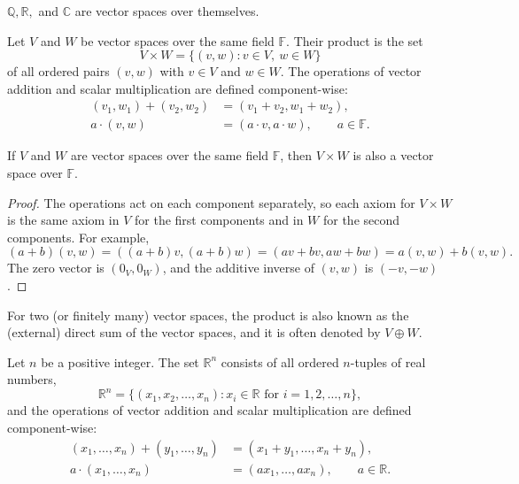 \begin{corollary}\label{L1-cor:fields}
    $\mathbb{Q}, \mathbb{R},$ and $\mathbb{C}$ are vector spaces over themselves.
\end{corollary}

\begin{definition}
    Let $V$ and $W$ be vector spaces over the same field $\mathbb{F}$. Their product is the set
    \[V \times W = \{(v, w) : v \in V, \ w \in W\}\]
    of all ordered pairs $(v, w)$ with $v \in V$ and $w \in W$. The operations of vector addition and scalar multiplication are defined component-wise:
    \begin{align*}
        (v_1, w_1) + (v_2, w_2) &= (v_1 + v_2, w_1 + w_2), \\
        a \cdot (v, w) &= (a \cdot v, a \cdot w), \qquad a \in \mathbb{F}.
    \end{align*}
\end{definition}

\begin{proposition}\label{L1-prop:product}
    If $V$ and $W$ are vector spaces over the same field $\mathbb{F}$, then $V \times W$ is also a vector space over $\mathbb{F}$.
\end{proposition}

\begin{proof}
    The operations act on each component separately, so each axiom for $V \times W$ is the same axiom in $V$ for the first components and in $W$ for the second components. For example,
    \[(a + b)(v, w) = ((a + b)v, (a + b)w) = (av + bv, aw + bw) = a(v, w) + b(v, w).\]
    The zero vector is $(0_V, 0_W)$, and the additive inverse of $(v, w)$ is $(-v, -w)$.
\end{proof}

\begin{remark}
    For two (or finitely many) vector spaces, the product is also known as the (external) direct sum of the vector spaces, and it is often denoted by $V \oplus W$.
\end{remark}

\begin{definition}
    Let $n$ be a positive integer. The set $\mathbb{R}^n$ consists of all ordered $n$-tuples of real numbers,
    \[\mathbb{R}^n = \{(x_1, x_2, \ldots, x_n) : x_i \in \mathbb{R} \text{ for } i = 1, 2, \ldots, n\},\]
    and the operations of vector addition and scalar multiplication are defined component-wise:
    \begin{align*}
        (x_1, \ldots, x_n) + (y_1, \ldots, y_n) &= (x_1 + y_1, \ldots, x_n + y_n), \\
        a \cdot (x_1, \ldots, x_n) &= (a x_1, \ldots, a x_n), \qquad a \in \mathbb{R}.
    \end{align*}
\end{definition}

